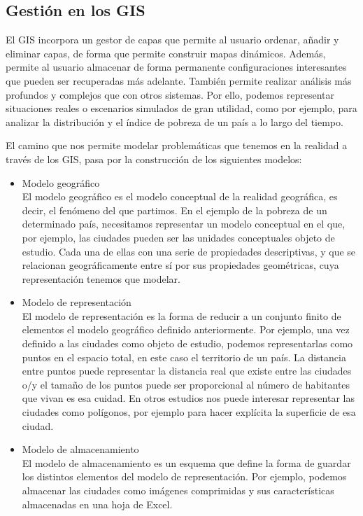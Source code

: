 \subsection{Gestión en los GIS}

El GIS incorpora un gestor de capas que permite al usuario ordenar, añadir y eliminar capas, de forma que permite construir mapas dinámicos. 
Además, permite al usuario almacenar de forma permanente configuraciones interesantes que pueden ser recuperadas más adelante.
También permite realizar análisis más profundos y complejos que con otros sistemas.
Por ello, podemos representar situaciones reales o escenarios simulados de gran utilidad, como por ejemplo, para analizar la distribución y el índice de pobreza de un país a lo largo del tiempo.

El camino que nos permite modelar problemáticas que tenemos en la realidad a través de los GIS, pasa por la construcción de los siguientes modelos:
\begin{itemize}
  \item Modelo geográfico\\
  El modelo geográfico es el modelo conceptual de la realidad geográfica, es decir, el fenómeno del que partimos. 
  En el ejemplo de la pobreza de un determinado país, necesitamos representar un modelo conceptual en el que, por ejemplo, las ciudades pueden ser las unidades conceptuales objeto de estudio.
  Cada una de ellas con una serie de propiedades descriptivas, y que se relacionan geográficamente entre sí por sus propiedades geométricas, cuya representación tenemos que modelar.  
  \item Modelo de representación\\
  El modelo de representación es la forma de reducir a un conjunto finito de elementos el modelo geográfico definido anteriormente. 
  Por ejemplo, una vez definido a las ciudades como objeto de estudio, podemos representarlas como puntos en el espacio total, en este caso el territorio de un país.
  La distancia entre puntos puede representar la distancia real que existe entre las ciudades o/y el tamaño de los puntos puede ser proporcional al número de habitantes que vivan es esa cuidad.
  En otros estudios nos puede interesar representar las ciudades como polígonos, por ejemplo para hacer explícita la superficie de esa ciudad.
  \item Modelo de almacenamiento\\
  El modelo de almacenamiento es un esquema que define la forma de guardar los distintos elementos del modelo de representación. 
  Por ejemplo, podemos almacenar las ciudades como imágenes comprimidas y sus características almacenadas en una hoja de Excel.
\end{itemize}


